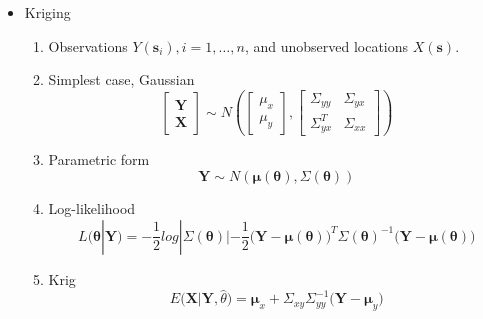 \documentclass{article}
\begin{document}
\begin{itemize}
\item Kriging
  \begin{enumerate}
  \item Observations $Y(\pmb{s}_{i}), i = 1, \hdots, n$, and unobserved locations $X(\pmb{s})$.
  \item Simplest case, Gaussian
  $$\begin{bmatrix}
        \pmb{Y}   \\
        \pmb{X}
        \end{bmatrix}
      \sim
     N \left(
        \begin{bmatrix}
        \mu_{x}   \\
        \mu_{y}
        \end{bmatrix}
        ,
        \begin{bmatrix}
        \Sigma_{yy}     & \Sigma_{yx} \\
        \Sigma_{yx}^{T} & \Sigma_{xx}
        \end{bmatrix}
        \right) $$
  \item Parametric form
  $$ \pmb{Y} \sim N(\pmb{\mu(\theta)}, \Sigma(\pmb{\theta})) $$
  \item Log-likelihood
  $$ L(\pmb{\theta}|\pmb{Y}) = -\frac{1}{2}log|\Sigma(\pmb{\theta})| - \frac{1}{2}\Big( \pmb{Y} - \pmb{\mu}(\pmb{\theta})\Big)^{T} \Sigma(\pmb{\theta})^{-1} \Big( \pmb{Y} - \pmb{\mu}(\pmb{\theta})\Big) $$
  \item Krig
  $$ E \Big(\pmb{X}|\pmb{Y}, \hat{\theta} \Big) = \pmb{\mu}_{x} + \Sigma_{xy} \Sigma_{yy}^{-1} (\pmb{Y} - \pmb{\mu}_{y} \Big)$$
  \end{enumerate}


\end{itemize}
\end{document}
